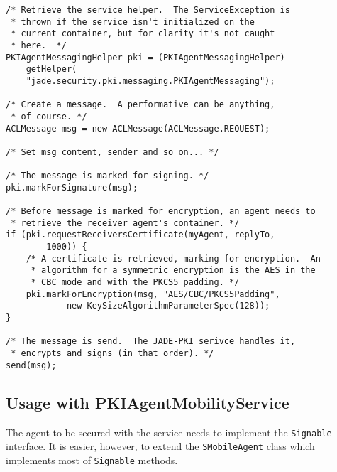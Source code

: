 \documentclass[a4paper,11pt]{article}
\begin{document}
\begin{verbatim}
/* Retrieve the service helper.  The ServiceException is
 * thrown if the service isn't initialized on the
 * current container, but for clarity it's not caught
 * here.  */
PKIAgentMessagingHelper pki = (PKIAgentMessagingHelper)
    getHelper(
    "jade.security.pki.messaging.PKIAgentMessaging");

/* Create a message.  A performative can be anything,
 * of course. */
ACLMessage msg = new ACLMessage(ACLMessage.REQUEST);

/* Set msg content, sender and so on... */

/* The message is marked for signing. */
pki.markForSignature(msg);

/* Before message is marked for encryption, an agent needs to
 * retrieve the receiver agent's container. */
if (pki.requestReceiversCertificate(myAgent, replyTo,
        1000)) {
    /* A certificate is retrieved, marking for encryption.  An
     * algorithm for a symmetric encryption is the AES in the
     * CBC mode and with the PKCS5 padding. */
    pki.markForEncryption(msg, "AES/CBC/PKCS5Padding",
            new KeySizeAlgorithmParameterSpec(128));
}

/* The message is send.  The JADE-PKI serivce handles it,
 * encrypts and signs (in that order). */
send(msg);
\end{verbatim}

\subsection{Usage with PKI\-Agent\-Mo\-bi\-li\-ty\-Ser\-vice}

The agent to be secured with the service needs to implement the
\texttt{Signable} interface. It is easier, however, to extend the
\texttt{SMo\-bile\-Agent} class which implements most of \texttt{Signable}
methods.
\end{document}
